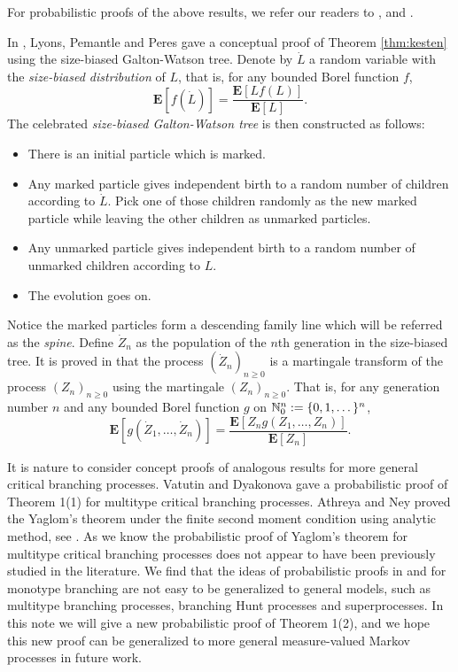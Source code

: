 \documentclass[12pt]{amsart}
\numberwithin{equation}{section}
\newcommand{\defn}[1]{{\em #1}}
\newcommand{\expr}[1]{\left( #1 \right)}
\newcommand{\brac}[1]{\left[ #1 \right]}
\newcommand{\expct}{\mathbf E}
\begin{document}
	For probabilistic proofs of the above results, we refer our readers to \cite{lyons1995conceptual}, \cite{geiger1999elementary} and \cite{geiger2000new}.
\par
	In \cite{lyons1995conceptual}, Lyons, Pemantle and Peres gave a conceptual proof of Theorem \ref{thm:kesten} using the size-biased Galton-Watson tree.
	Denote by $\dot L$ a random variable with the \defn{size-biased distribution} of $L$, that is, for any bounded Borel function $f$,
\begin{equation*}
		\expct\brac{f\expr{\dot L}}
	=
		\frac{\expct\brac{Lf(L)}}{\expct\brac{L}}.
\end{equation*}
	The celebrated \defn{size-biased Galton-Watson tree} is then constructed as follows:
\begin{itemize}
\item
	There is an initial particle which is marked.
\item
	Any marked particle gives independent birth to a random number of children according to $\dot L$. Pick one of those children randomly as the new marked particle while leaving the other children as unmarked particles.
\item
	Any unmarked particle gives independent birth to a random number of unmarked children according to $L$.
\item
	The evolution goes on.
\end{itemize}
\par
	Notice the marked particles form a descending family line which will be referred as the \defn{spine}.
	Define $\dot Z_n$ as the population of the $n$th generation in the size-biased tree.
	It is proved in \cite{lyons1995conceptual} that the process $(\dot Z_n)_{n\ge 0}$ is a martingale transform of the process $(Z_n)_{n\ge 0}$ using the martingale $(Z_n)_{n\ge 0}.$
	That is, for any generation number $n$ and any bounded Borel function $g$ on
		$\mathbb N_0^{n} := \{0,1,\dots\}^n$,
\begin{equation}
\label{eq:htransformation}
				\expct\brac{g\expr{\dot Z_1,\dots,\dot Z_n}}
	=
                \frac{\expct\brac{Z_n g\expr{Z_1,\dots, Z_n}}}{\expct\brac{Z_n}}.
\end{equation}
\par
It is  nature to consider concept proofs of analogous results for more general critical branching processes. Vatutin and  Dyakonova \cite{VD} gave a probabilistic proof of Theorem 1(1) for multitype critical branching processes. Athreya and Ney \cite{AN} proved the Yaglom's theorem under the finite second moment condition using analytic method, see \cite[Section V.5]{AN}. As we know the probabilistic proof  of Yaglom's theorem for multitype critical branching processes does not appear to have been previously studied in the literature. We find that the ideas of  probabilistic proofs in \cite{lyons1995conceptual} and \cite{geiger2000new} for monotype branching are not easy to be generalized to general models, such as multitype  branching processes, branching Hunt processes and superprocesses. In this note we will give a new probabilistic proof of Theorem 1(2), and we hope this new proof can be generalized to more general measure-valued Markov processes in future work.
\end{document}
